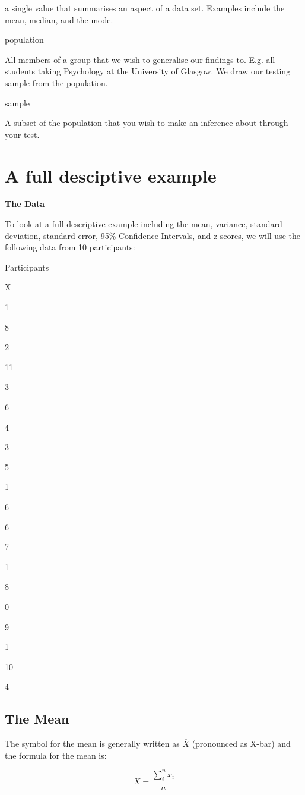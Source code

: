 \documentclass[
  oneside]{book}
\begin{document}
a single value that summarises an aspect of a data set. Examples include the mean, median, and the mode.

population

All members of a group that we wish to generalise our findings to. E.g. all students taking Psychology at the University of Glasgow. We draw our testing sample from the population.

sample

A subset of the population that you wish to make an inference about through your test.

\hypertarget{a-full-desciptive-example}{%
\section{A full desciptive example}\label{a-full-desciptive-example}}

\textbf{The Data}

To look at a full descriptive example including the mean, variance, standard deviation, standard error, 95\% Confidence Intervals, and z-scores, we will use the following data from 10 participants:

Participants

X

1

8

2

11

3

6

4

3

5

1

6

6

7

1

8

0

9

1

10

4

\hypertarget{the-mean-1}{%
\subsection{The Mean}\label{the-mean-1}}

The symbol for the mean is generally written as \(\overline{X}\) (pronounced as X-bar) and the formula for the mean is:

\[\overline{X} = \frac{\sum_i^n{x_i}}{n}\]
\end{document}
